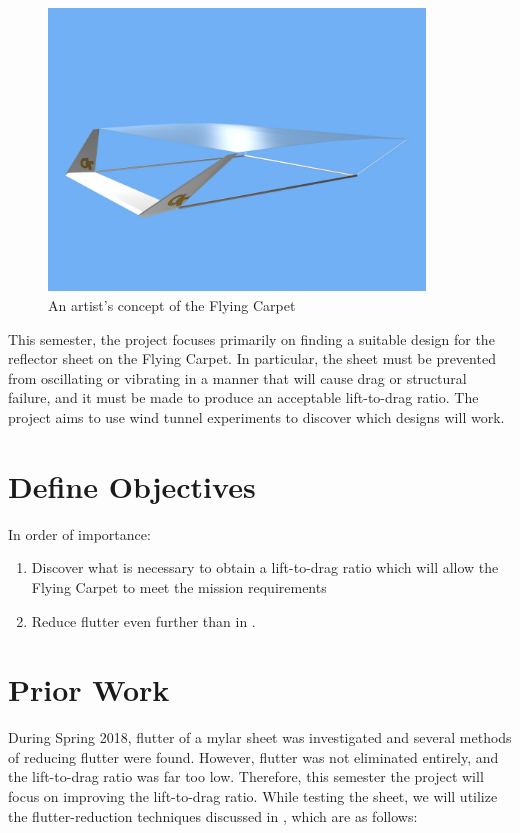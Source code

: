 \documentclass[12pt]{report} %
\begin{document}
\begin{figure}
\includegraphics[width = 10cm]{FlyingCarpet.jpg}
\caption{An artist's concept of the Flying Carpet}
\end{figure}

This semester, the project focuses primarily on finding a suitable design for the reflector sheet on the Flying Carpet.
In particular, the sheet must
be prevented from oscillating or vibrating in a manner that will cause drag or structural failure, and it must be made to produce an
acceptable lift-to-drag ratio. The project aims to use wind tunnel experiments to discover which designs will work.

\chapter{Define Objectives}
In order of importance:

\begin{enumerate}

\item Discover what is necessary to obtain a lift-to-drag ratio which will allow the Flying Carpet to meet the mission requirements

\item Reduce flutter even further than in \cite{us}.

\end{enumerate}

\chapter{Prior Work}
During Spring 2018, flutter of a mylar sheet was investigated and several methods of reducing flutter were found. However,
flutter was not eliminated entirely, and the lift-to-drag ratio was far too low. \cite{us} Therefore, this semester the project will
focus on improving the lift-to-drag ratio. While testing the sheet, we will utilize the flutter-reduction techniques discussed in
\cite{us}, which are as follows:
\end{document}
